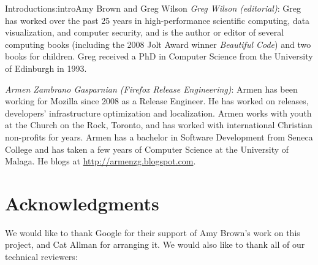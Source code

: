 \begin{aosachapter}{Introduction}{s:intro}{Amy Brown and Greg Wilson}
\emph{Greg Wilson (editorial)}: Greg has worked over the past 25 years
in high-performance scientific computing, data visualization, and
computer security, and is the author or editor of several computing
books (including the 2008 Jolt Award winner \emph{Beautiful Code}) and
two books for children.  Greg received a PhD in Computer Science
from the University of Edinburgh in 1993.

\emph{Armen Zambrano Gasparnian (Firefox Release Engineering)}: Armen has been
working for Mozilla since 2008 as a Release Engineer. He has worked on
releases, developers' infrastructure optimization and localization.  Armen
works with youth at the Church on the Rock, Toronto, and has worked with
international Christian non-profits for years. Armen has a bachelor in
Software Development from Seneca College and has taken a few years of Computer
Science at the University of Malaga.  He blogs at
\url{http://armenzg.blogspot.com}.

\section*{Acknowledgments}

We would like to thank Google for their support of Amy Brown's work on this
project, and Cat Allman for arranging it.  We would also like to thank
all of our technical reviewers:


\end{aosachapter}
